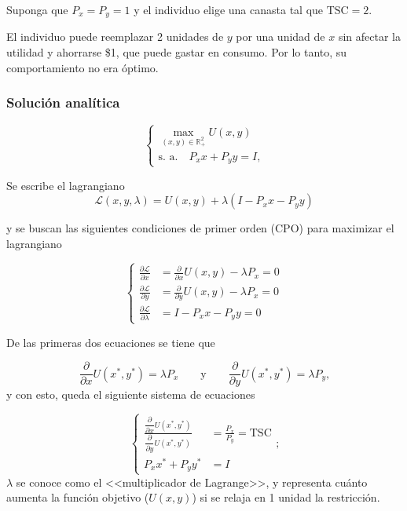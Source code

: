 \documentclass{report}
\begin{document}
Suponga que $P_x=P_y=1$ y el individuo elige una canasta tal que $\mathrm{TSC}=2$.

El individuo puede reemplazar 2 unidades de $y$ por una unidad de $x$ sin afectar la utilidad y ahorrarse \$1, que puede gastar en consumo. Por lo tanto, su comportamiento no era óptimo.

\subsubsection{Solución analítica}

$$\left\{
\begin{matrix}
\displaystyle{\max_{(x,y)\in\mathbb{R}_+^2}U\!\left(x,y\right)} \\
\text{s. a.}\quad P_xx+P_yy=I\text{,}
\end{matrix}\right.$$

Se escribe el lagrangiano
$$\mathscr{L}\!\left(x,y,\lambda\right)=U\!\left(x,y\right)+\lambda\left(I-P_xx-P_yy\right)$$

y se buscan las siguientes condiciones de primer orden (CPO) para maximizar el lagrangiano

$$\left\{
\begin{align}
\frac{\partial\mathscr{L}}{\partial x} & = \frac{\partial}{\partial x}U\!\left(x,y\right)-\lambda P_x=0 \\
\frac{\partial\mathscr{L}}{\partial y} & = \frac{\partial}{\partial y}U\!\left(x,y\right)-\lambda P_x=0 \\
\frac{\partial\mathscr{L}}{\partial \lambda} & = I-P_xx-P_yy=0
\end{align}\right.$$

De las primeras dos ecuaciones se tiene que

$$\frac{\partial}{\partial x}U\!\left(x^*,y^*\right)=\lambda P_x\qquad\text{y}\qquad\frac{\partial}{\partial y}U\!\left(x^*,y^*\right)=\lambda P_y\text{,}$$
y con esto, queda el siguiente sistema de ecuaciones

$$\left\{
\begin{align}
\frac{\dfrac{\partial}{\partial x}U\!\left(x^*,y^*\right)}{\dfrac{\partial}{\partial y}U\!\left(x^*,y^*\right)}&=\frac{P_x}{P_y}=\mathrm{TSC} \\
P_xx^*+P_yy^*&=I
\end{align}\right.\text{;}$$
$\lambda$ se conoce como el <<multiplicador de Lagrange>>, y representa cuánto aumenta la función objetivo ($U\!\left(x,y\right)$) si se relaja en 1 unidad la restricción.
\end{document}
